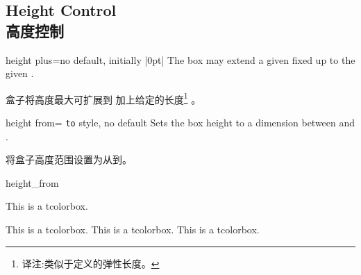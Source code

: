 \setcounter{section}{4}
\setcounter{subsection}{9}
\setcounter{subsubsection}{0}
\subsection{Height Control\\高度控制}\label{sec:heightcontrol}

% 
% 









\begin{docTcbKey}{height plus}{=}{no default, initially |0pt|}
The box may extend a given fixed  up to the given .

盒子将高度最大可扩展到  加上给定的长度\footnote{译注:类似于定义的弹性长度。} 。

\end{docTcbKey}


\begin{docTcbKey}{height from}{= \texttt{to} }{style, no default}
Sets the box height to a dimension between  and .

将盒子高度范围设置为从到。
\begin{exdispExample}{height_from}

\begin{mybox}
This is a tcolorbox.
\end{mybox}
\begin{mybox}
This is a tcolorbox. This is a tcolorbox. This is a tcolorbox.
\end{mybox}
\begin{mybox}
\lipsum[2]
\end{mybox}
\end{exdispExample}
\end{docTcbKey}




